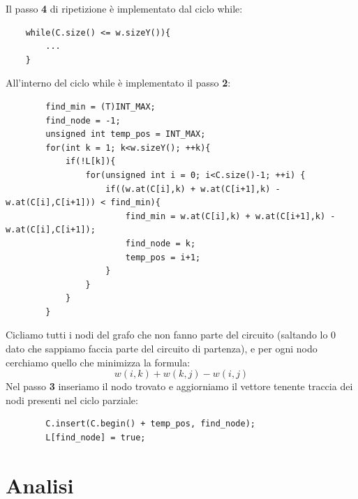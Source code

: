 \documentclass[]{article}
\begin{document}
\begin{flushleft}
Il passo \textbf{4} di ripetizione è implementato dal ciclo while:
\lstset{language=c++, style=mystyle, firstnumber=14}
\begin{lstlisting}
    while(C.size() <= w.sizeY()){
   	    ...    
    }
\end{lstlisting}
All'interno del ciclo while è implementato il passo \textbf{2}:
\lstset{language=c++, style=mystyle, firstnumber=15}
\begin{lstlisting}
        find_min = (T)INT_MAX;
        find_node = -1;
        unsigned int temp_pos = INT_MAX;
        for(int k = 1; k<w.sizeY(); ++k){
            if(!L[k]){
                for(unsigned int i = 0; i<C.size()-1; ++i) {
                    if((w.at(C[i],k) + w.at(C[i+1],k) - w.at(C[i],C[i+1])) < find_min){
                        find_min = w.at(C[i],k) + w.at(C[i+1],k) - w.at(C[i],C[i+1]);
                        find_node = k;
                        temp_pos = i+1;
                    }
                }
            }
        }
\end{lstlisting}
Cicliamo tutti i nodi del grafo che non fanno parte del circuito (saltando lo 0 dato che sappiamo faccia parte del circuito di partenza), e per ogni nodo cerchiamo quello che minimizza la formula: 
$$w(i,k)+w(k,j)-w(i,j)$$
Nel passo \textbf{3} inseriamo il nodo trovato e aggiorniamo il vettore tenente traccia dei nodi presenti nel ciclo parziale:
\lstset{language=c++, style=mystyle, firstnumber=29}
\begin{lstlisting}
        C.insert(C.begin() + temp_pos, find_node);
        L[find_node] = true;
\end{lstlisting}

\end{flushleft}
\newpage
\section{Analisi}
\end{document}

